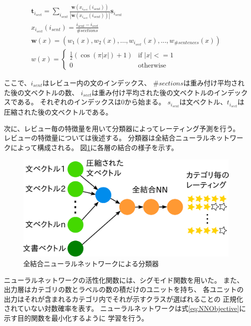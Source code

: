 \documentclass[twocolumn,a4paper]{ltjarticle}
\makeatletter
\let\tti@includegraphics\includegraphics
\renewcommand{\includegraphics}[1]{%
    \tti@includegraphics[width=\linewidth]{#1}}
\makeatother
\begin{document}
\begin{gather}
  \mathbf{t}_{i_{sect}} = \sum_{i_{sent}}
                          \frac{\mathbf{w}(x_{i_{sect}}(i_{sent}))}
                               {|\mathbf{w}(x_{i_{sect}}(i_{sent}))|}
                          \mathbf{s}_{i_{sent}} \\
  x_{i_{sect}}(i_{sent}) = \frac{i_{sent} - i_{sect}}{\#sections} \\
  \mathbf{w}(x) = (w_{1}(x), w_{2}(x), ..., w_{i_{sect}}(x),
                   ..., w_{\#sentences}(x)) \\
  w(x) = \begin{cases}
    \frac{1}{2} (\cos(\pi|x|) + 1) &\text{if $|x| <= 1$} \\
    0 &\text{otherwise}
  \end{cases}
\end{gather}

ここで、$i_{sent}$はレビュー内の文のインデックス、
$\#sections$は重み付け平均された後の文ベクトルの数、
$i_{sect}$は重み付け平均された後の文ベクトルのインデックスである。
それぞれのインデックスは0から始まる。
$s_{i_{sent}}$は文ベクトル、$t_{i_{sect}}$は圧縮された後の文ベクトルである。

次に、レビュー毎の特徴量を用いて分類器によってレーティング予測を行う。
レビューの特徴量については後述する。
分類器は全結合ニューラルネットワークによって構成される。
図\ref{fig:MyModel}に各層の結合の様子を示す。

\begin{figure}
  \includegraphics{fig/model.png}
  \caption{全結合ニューラルネットワークによる分類器}
  \label{fig:MyModel}
\end{figure}

ニューラルネットワークの活性化関数には、シグモイド関数を用いた。
また、出力層はカテゴリの数とラベルの数の積だけのユニットを持ち、
各ユニットの出力はそれが含まれるカテゴリ内でそれが示すクラスが選ばれることの
正規化されていない対数確率を表す。
ニューラルネットワークは式\ref{eq:NNObjective}に示す目的関数を最小化するように
学習を行う。
\end{document}
